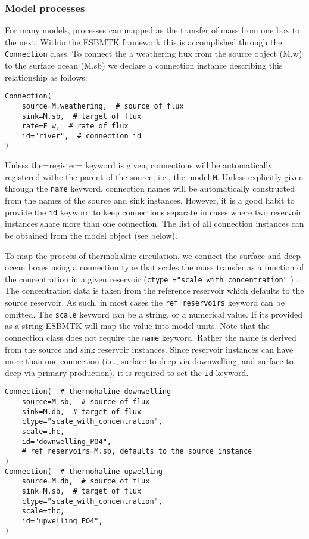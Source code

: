 \documentclass[11pt]{article}
\begin{document}
\subsubsection{Model processes}
\label{sec:org9abb575}
For many models, processes can mapped as the transfer of mass from one box to the next. Within the ESBMTK framework this is accomplished through the \texttt{Connection} class. To connect the a weathering flux from the source object (M.w) to the surface ocean (M.sb) we declare a connection instance describing this relationship as follows:
\begin{verbatim}
Connection(
    source=M.weathering,  # source of flux
    sink=M.sb,  # target of flux
    rate=F_w,  # rate of flux
    id="river",  # connection id
)
\end{verbatim}
Unless the=register= keyword is given, connections will be automatically registered withe the parent of the source, i.e., the model \texttt{M}. Unless explicitly given through the \texttt{name} keyword, connection names will be automatically constructed from the names of the source and sink instances. However, it is a good habit to provide the \texttt{id} keyword to keep connections separate in cases where two reservoir instances share more than one connection. The list of all connection instances can be obtained from the model object (see below).

To map the process of thermohaline circulation, we connect the surface and deep ocean boxes  using a connection type that scales the mass transfer as a function of the concentration in a given reservoir (\texttt{ctype ="scale\_with\_concentration"} ) . The concentration data is taken from the reference reservoir which defaults to the source reservoir. As such, in most cases the \texttt{ref\_reservoirs} keyword can be omitted. The \texttt{scale} keyword can be a string, or a numerical value. If its provided as a string ESBMTK will map the value into model units. Note that the connection class does not require the \texttt{name} keyword. Rather the name is derived from the source and sink reservoir instances. Since reservoir instances can have more than one connection (i.e., surface to deep via downwelling, and surface to deep via primary production), it is required to set the \texttt{id} keyword.
\begin{verbatim}
Connection(  # thermohaline downwelling
    source=M.sb,  # source of flux
    sink=M.db,  # target of flux
    ctype="scale_with_concentration",
    scale=thc,
    id="downwelling_PO4",
    # ref_reservoirs=M.sb, defaults to the source instance
)
Connection(  # thermohaline upwelling
    source=M.db,  # source of flux
    sink=M.sb,  # target of flux
    ctype="scale_with_concentration",
    scale=thc,
    id="upwelling_PO4",
)
\end{verbatim}
\end{document}
